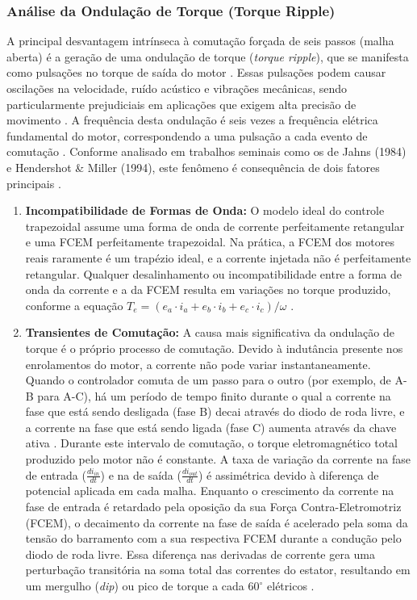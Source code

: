  \subsubsection{Análise da Ondulação de Torque (Torque Ripple)}
A principal desvantagem intrínseca à comutação forçada de seis passos (malha aberta) é a geração de uma ondulação de torque (\textit{torque ripple}), que se manifesta como pulsações no torque de saída do motor \cite{jahns1984torque, ali2017implementation}. Essas pulsações podem causar oscilações na velocidade, ruído acústico e vibrações mecânicas, sendo particularmente prejudiciais em aplicações que exigem alta precisão de movimento \cite{jahns1996pulsating}. A frequência desta ondulação é seis vezes a frequência elétrica fundamental do motor, correspondendo a uma pulsação a cada evento de comutação \cite{jahns1984torque}. Conforme analisado em trabalhos seminais como os de Jahns (1984) e Hendershot \& Miller (1994), este fenômeno é consequência de dois fatores principais \cite{kim2017electric, hendershot1994design}.

\begin{enumerate}
    \item \textbf{Incompatibilidade de Formas de Onda:} O modelo ideal do controle trapezoidal assume uma forma de onda de corrente perfeitamente retangular e uma FCEM perfeitamente trapezoidal. Na prática, a FCEM dos motores reais raramente é um trapézio ideal, e a corrente injetada não é perfeitamente retangular. Qualquer desalinhamento ou incompatibilidade entre a forma de onda da corrente e a da FCEM resulta em variações no torque produzido, conforme a equação $T_{e} = (e_{a} \cdot i_{a} + e_{b} \cdot i_{b} + e_{c} \cdot i_{c}) / \omega$ \cite{hendershot1994design}.

    \item \textbf{Transientes de Comutação:} A causa mais significativa da ondulação de torque é o próprio processo de comutação. Devido à indutância presente nos enrolamentos do motor, a corrente não pode variar instantaneamente. Quando o controlador comuta de um passo para o outro (por exemplo, de A-B para A-C), há um período de tempo finito durante o qual a corrente na fase que está sendo desligada (fase B) decai através do diodo de roda livre, e a corrente na fase que está sendo ligada (fase C) aumenta através da chave ativa \cite{jahns1996pulsating, joice2013compensation}. Durante este intervalo de comutação, o torque eletromagnético total produzido pelo motor não é constante. A taxa de variação da corrente na fase de entrada ($\frac{di_{in}}{dt}$) e na de saída ($\frac{di_{out}}{dt}$) é assimétrica devido à diferença de potencial aplicada em cada malha. Enquanto o crescimento da corrente na fase de entrada é retardado pela oposição da sua Força Contra-Eletromotriz (FCEM), o decaimento da corrente na fase de saída é acelerado pela soma da tensão do barramento com a sua respectiva FCEM durante a condução pelo diodo de roda livre. Essa diferença nas derivadas de corrente gera uma perturbação transitória na soma total das correntes do estator, resultando em um mergulho (\textit{dip}) ou pico de torque a cada $60^{\circ}$ elétricos \cite{choi1998commutation, chen2019commutation}.

\end{enumerate}

